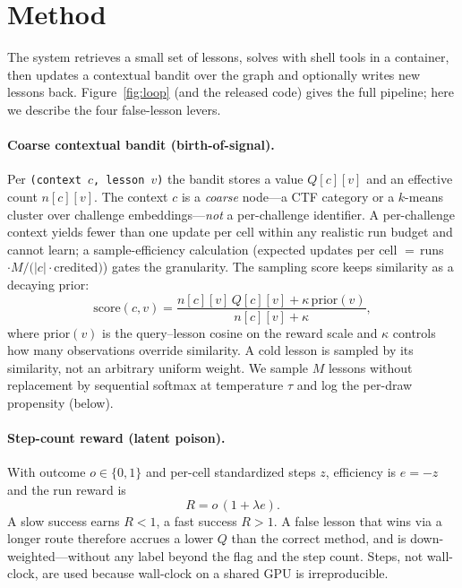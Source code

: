 \documentclass[10pt,twocolumn]{article}
\begin{document}
\section{Method}\label{sec:method}
The system retrieves a small set of lessons, solves with shell tools in a
container, then updates a contextual bandit over the graph and optionally writes
new lessons back. Figure~\ref{fig:loop} (and the released code) gives the full
pipeline; here we describe the four false-lesson levers.

\paragraph{Coarse contextual bandit (birth-of-signal).}
Per \texttt{(context $c$, lesson $v$)} the bandit stores a value $Q[c][v]$ and an
effective count $n[c][v]$. The context $c$ is a \emph{coarse} node---a CTF
category or a $k$-means cluster over challenge embeddings---\emph{not} a
per-challenge identifier. A per-challenge context yields fewer than one update per
cell within any realistic run budget and cannot learn; a sample-efficiency
calculation (expected updates per cell $=\,$runs$\cdot M/(|c|\cdot$credited$)$)
gates the granularity. The sampling score keeps similarity as a decaying prior:
\begin{equation}
\mathrm{score}(c,v)=\frac{n[c][v]\,Q[c][v]+\kappa\,\mathrm{prior}(v)}{n[c][v]+\kappa},
\end{equation}
where $\mathrm{prior}(v)$ is the query--lesson cosine on the reward scale and
$\kappa$ controls how many observations override similarity. A cold lesson is
sampled by its similarity, not an arbitrary uniform weight. We sample $M$ lessons
without replacement by sequential softmax at temperature $\tau$ and log the
per-draw propensity (below).

\paragraph{Step-count reward (latent poison).}
With outcome $o\in\{0,1\}$ and per-cell standardized steps $z$, efficiency is
$e=-z$ and the run reward is
\begin{equation}
R = o\,(1+\lambda e).
\end{equation}
A slow success earns $R<1$, a fast success $R>1$. A false lesson that wins via a
longer route therefore accrues a lower $Q$ than the correct method, and is
down-weighted---without any label beyond the flag and the step count. Steps, not
wall-clock, are used because wall-clock on a shared GPU is irreproducible.
\end{document}
